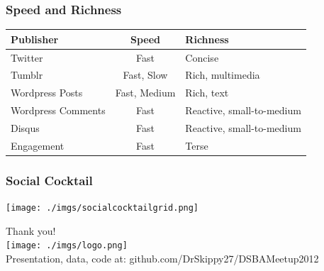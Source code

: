\documentclass{beamer}
\begin{document}
\begin{frame} \frametitle{Speed and Richness}
\begin{table}
\begin{tabular}{m{2cm}| c |m{3cm}}
\hline
   {Publisher}   &   {Speed} & {Richness} \\
\hline 
    Twitter       & Fast & Concise  \\ [3pt]
    Tumblr       & Fast, Slow & Rich, multimedia\\  [3pt]
    Wordpress Posts & Fast, Medium &  Rich, text\\  [3pt]
    Wordpress Comments  & Fast & Reactive, small-to-medium\\  [3pt]
    Disqus         & Fast & Reactive, small-to-medium\\  [3pt]
    Engagement   & Fast & Terse\\ 
\hline
\end{tabular}
\end{table}
\end{frame}


\begin{frame}\frametitle{Social Cocktail}
  \begin{center}
    \texttt{[image: ./imgs/socialcocktailgrid.png]}
  \end{center}
\end{frame}

\begin{frame}
  \begin{center}
  \Large{Thank you!  \\ [20pt]}
    \texttt{[image: ./imgs/logo.png]} \\ [15pt]
   \Large{Presentation, data, code at: github.com/DrSkippy27/DSBAMeetup2012 }
  \end{center}
\end{frame}
\end{document}
